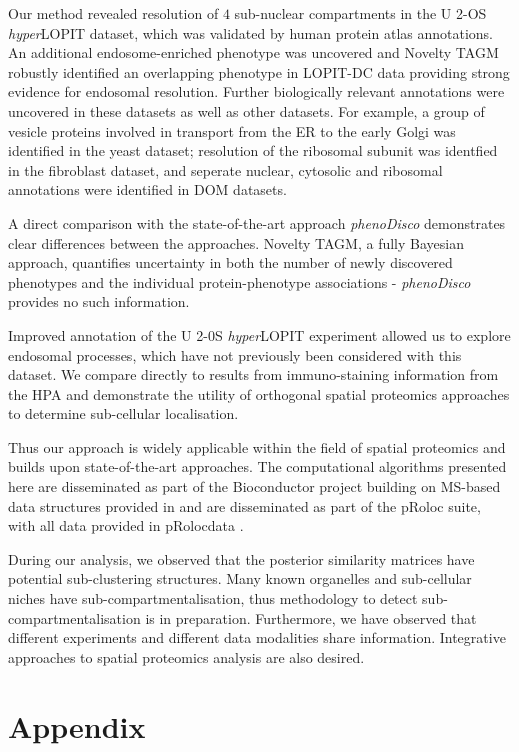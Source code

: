 \documentclass[12pt,english]{article}
\begin{document}
Our method revealed resolution of $4$ sub-nuclear compartments in the U 2-OS \textit{hyper}LOPIT dataset, which was validated by human protein atlas annotations. An additional endosome-enriched phenotype was uncovered and Novelty TAGM robustly identified an overlapping phenotype in LOPIT-DC data providing strong evidence for endosomal resolution. Further biologically relevant annotations were uncovered in these datasets as well as other datasets. For example, a group of vesicle proteins involved in transport from the ER to the early Golgi was identified in the yeast dataset; resolution of the ribosomal subunit was identfied in the fibroblast dataset, and seperate nuclear, cytosolic and ribosomal annotations were identified in DOM datasets.

A direct comparison with the state-of-the-art approach \textit{phenoDisco} demonstrates clear differences between the approaches. Novelty TAGM, a fully Bayesian approach, quantifies uncertainty in both the number of newly discovered phenotypes and the individual protein-phenotype associations - \textit{phenoDisco} provides no such information.

Improved annotation of the U 2-0S \textit{hyper}LOPIT experiment allowed us to explore endosomal processes, which have not previously been considered with this dataset. We compare directly to results from immuno-staining information from the HPA and demonstrate the utility of orthogonal spatial proteomics approaches to determine sub-cellular localisation.

Thus our approach is widely applicable within the field of spatial proteomics and builds upon state-of-the-art approaches. The computational algorithms presented here are disseminated as part of the Bioconductor project \citep{Bioconductor::2004, Huber:2015} building on MS-based data structures provided in \cite{MSnbase:2012} and are disseminated as part of the pRoloc suite, with all data provided in pRolocdata \citep{pRoloc:2014}.

During our analysis, we observed that the posterior similarity matrices have potential sub-clustering structures. Many known organelles and sub-cellular niches have sub-compartmentalisation, thus methodology to detect sub-compartmentalisation is in preparation. Furthermore, we have observed that different experiments and different data modalities share information. Integrative approaches to spatial proteomics analysis are also desired. 

\section{Appendix}
\end{document}
